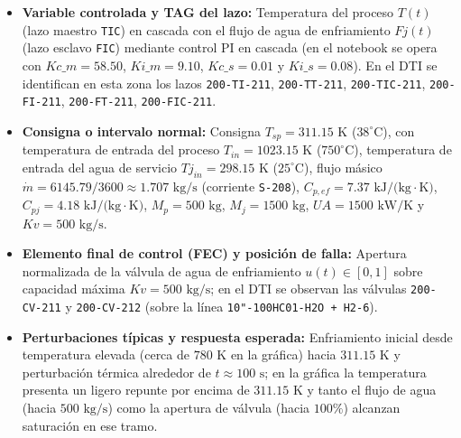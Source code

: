 \documentclass[11pt,letterpaper]{article}
\begin{document}
\begin{itemize}
\begin{itemize}
    \item \textbf{Variable controlada y TAG del lazo:} Temperatura del proceso $T(t)$ (lazo maestro \texttt{TIC}) en cascada con el flujo de agua de enfriamiento $Fj(t)$ (lazo esclavo \texttt{FIC}) mediante control PI en cascada (en el notebook se opera con $Kc\_m = 58.50$, $Ki\_m = 9.10$, $Kc\_s = 0.01$ y $Ki\_s = 0.08$). En el DTI se identifican en esta zona los lazos \texttt{200-TI-211}, \texttt{200-TT-211}, \texttt{200-TIC-211}, \texttt{200-FI-211}, \texttt{200-FT-211}, \texttt{200-FIC-211}.
    \item \textbf{Consigna o intervalo normal:} Consigna $T_{sp} = 311.15\text{ K}$ ($38^\circ\text{C}$), con temperatura de entrada del proceso $T_{in} = 1023.15\text{ K}$ ($750^\circ\text{C}$), temperatura de entrada del agua de servicio $Tj_{in} = 298.15\text{ K}$ ($25^\circ\text{C}$), flujo másico $\dot{m} = 6145.79/3600 \approx 1.707\text{ kg/s}$ (corriente \texttt{S-208}), $C_{p,ef} = 7.37\text{ kJ/(kg}\cdot\text{K)}$, $C_{pj} = 4.18\text{ kJ/(kg}\cdot\text{K)}$, $M_p = 500\text{ kg}$, $M_j = 1500\text{ kg}$, $UA = 1500\text{ kW/K}$ y $Kv = 500\text{ kg/s}$.
    \item \textbf{Elemento final de control (FEC) y posición de falla:} Apertura normalizada de la válvula de agua de enfriamiento $u(t) \in [0, 1]$ sobre capacidad máxima $Kv = 500\text{ kg/s}$; en el DTI se observan las válvulas \texttt{200-CV-211} y \texttt{200-CV-212} (sobre la línea \texttt{10"-100HC01-H2O + H2-6}). 
    \item \textbf{Perturbaciones típicas y respuesta esperada:} Enfriamiento inicial desde temperatura elevada (cerca de $780\text{ K}$ en la gráfica) hacia $311.15\text{ K}$ y perturbación térmica alrededor de $t \approx 100\text{ s}$; en la gráfica la temperatura presenta un ligero repunte por encima de $311.15\text{ K}$ y tanto el flujo de agua (hacia $500\text{ kg/s}$) como la apertura de válvula (hacia $100\%$) alcanzan saturación en ese tramo.
\end{itemize}


\end{itemize}
\end{document}
